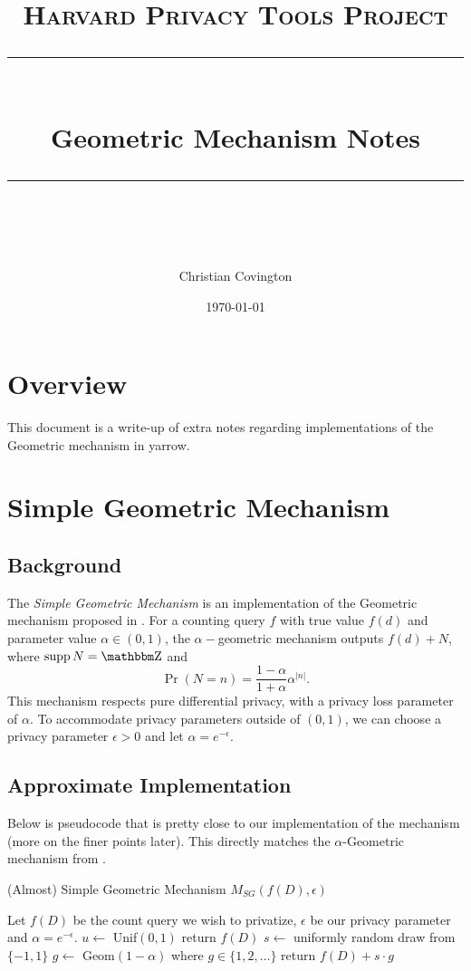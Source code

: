 \documentclass[11pt]{scrartcl} %
\title{
	\normalfont\normalsize
	\textsc{Harvard Privacy Tools Project}\\ %
	\vspace{25pt} %
	\rule{\linewidth}{0.5pt}\\ %
	\vspace{20pt} %
	{\huge Geometric Mechanism Notes}\\ %
	\vspace{12pt} %
	\rule{\linewidth}{2pt}\\ %
	\vspace{12pt} %
}
\author{\LARGE Christian Covington} %
\date{\normalsize\today} %
\begin{document}
\maketitle

\section{Overview}
This document is a write-up of extra notes regarding implementations of the Geometric mechanism
in yarrow.

\section{Simple Geometric Mechanism}
\subsection{Background}
The \emph{Simple Geometric Mechanism} is an implementation of the Geometric
mechanism proposed in \cite{GRS12}. For a counting query $f$ with true value $f(d)$
and parameter value $\alpha \in (0,1)$, the $\alpha-$geometric mechanism outputs
$f(d) + N$, where $\supp N = \Z$ and
\begin{equation}
    \label{eq:grs12_geom}
    \Pr(N = n) = \frac{1-\alpha}{1+\alpha} \alpha^{| n |}.
\end{equation}
This mechanism respects pure differential privacy, with a privacy loss parameter of $\alpha$.
To accommodate privacy parameters outside of $(0,1)$, we can choose a privacy parameter
$\epsilon > 0$ and let $\alpha = e^{-\epsilon}$. \newline

\subsection{Approximate Implementation}
Below is pseudocode that is pretty close to our implementation of the mechanism (more on the finer points later).
This directly matches the $\alpha$-Geometric mechanism from \cite{GRS12}.

\begin{algorithm}[H]
    \caption{(Almost) Simple Geometric Mechanism $M_{SG}(f(D), \epsilon)$}
    \label{alg:simp_geo_mec}
    \begin{algorithmic}[1]
        \State Let $f(D)$ be the count query we wish to privatize, $\epsilon$ be our privacy parameter and $\alpha = e^{-\epsilon}$.
        \State $u \gets$ Unif$(0,1)$
         \label{alg_step:return_zero}
            \State return $f(D)$
        \Else
            \State $s \gets$ uniformly random draw from $\{-1, 1\}$ \label{alg:unif_draw}
            \State $g \gets$ Geom$(1 - \alpha)$ where $g \in \{1,2,\hdots\}$ \label{alg:draw_geom}
            \State return $f(D) + s \cdot g$
        \EndIf
	\end{algorithmic}
\end{algorithm}
\end{document}
